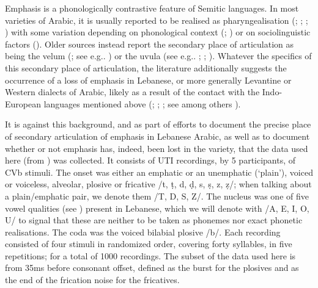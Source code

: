 \documentclass[
  man,
  longtable,
  nolmodern,
  notxfonts,
  notimes,
  colorlinks=true,linkcolor=blue,citecolor=blue,urlcolor=blue]{apa7}
\begin{document}
Emphasis is a phonologically contrastive feature of Semitic languages.
In most varieties of Arabic, it is usually reported to be realised as
pharyngealisation (;
; ; ) with some
variation depending on phonological context
(;
) or on sociolinguistic factors
(). Older sources
instead report the secondary place of articulation as being the velum
(; see e.g..
) or the uvula (see e.g..
;
;
). Whatever the specifics of
this secondary place of articulation, the literature additionally
suggests the occurrence of a loss of emphasis in Lebanese, or more
generally Levantine or Western dialects of Arabic, likely as a result of
the contact with the Indo-European languages mentioned above
(;
;
; see among others
).

It is against this background, and as part of efforts to document the
precise place of secondary articulation of emphasis in Lebanese Arabic,
as well as to document whether or not emphasis has, indeed, been lost in
the variety, that the data used here (from ) was collected. It consists of UTI recordings, by 5 participants,
of CVb stimuli. The onset was either an emphatic or an unemphatic
(`plain'), voiced or voiceless, alveolar, plosive or fricative /t, ṭ, d,
ḍ, s, ṣ, z, ẓ/; when talking about a plain/emphatic pair, we denote them
/T, D, S, Z/. The nucleus was one of five vowel qualities (see
) present in Lebanese, which we will
denote with /A, E, I, O, U/ to signal that these are neither to be taken
as phonemes nor exact phonetic realisations. The coda was the voiced
bilabial plosive /b/. Each recording consisted of four stimuli in
randomized order, covering forty syllables, in five repetitions; for a
total of 1000 recordings. The subset of the data used here is from 35ms
before consonant offset, defined as the burst for the plosives and as
the end of the frication noise for the fricatives.
\end{document}
